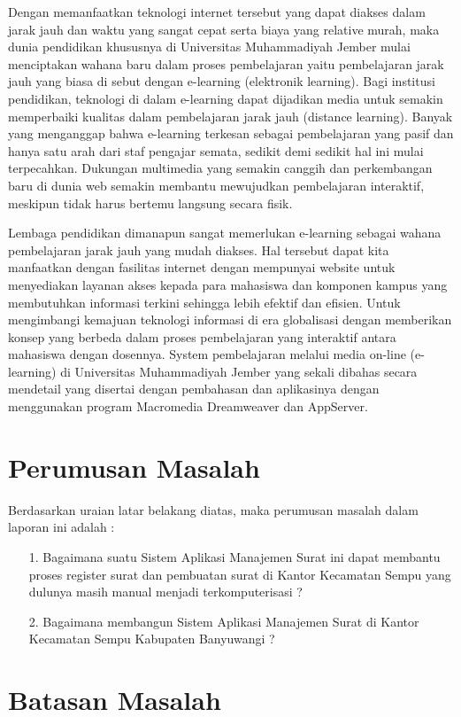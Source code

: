 \documentclass{jtetiproposalskripsi}
\begin{document}
Dengan memanfaatkan teknologi internet tersebut yang dapat diakses dalam jarak jauh dan waktu yang sangat cepat serta biaya yang relative murah, maka dunia pendidikan khususnya di Universitas Muhammadiyah Jember mulai menciptakan wahana baru dalam proses pembelajaran yaitu pembelajaran jarak jauh yang biasa di sebut dengan e-learning (elektronik  learning). Bagi institusi pendidikan, teknologi di dalam e-learning dapat dijadikan media untuk semakin memperbaiki kualitas dalam pembelajaran jarak jauh (distance learning). Banyak yang menganggap bahwa e-learning terkesan sebagai pembelajaran yang pasif dan hanya satu arah dari staf pengajar semata, sedikit demi sedikit hal ini mulai terpecahkan. Dukungan multimedia yang semakin canggih dan perkembangan baru di dunia web semakin membantu mewujudkan pembelajaran interaktif, meskipun tidak harus bertemu langsung secara fisik.

Lembaga pendidikan dimanapun sangat memerlukan e-learning sebagai wahana  pembelajaran jarak jauh yang mudah diakses. Hal tersebut dapat kita manfaatkan dengan fasilitas internet dengan mempunyai website untuk menyediakan layanan akses kepada para mahasiswa dan komponen kampus yang membutuhkan informasi terkini sehingga lebih efektif dan efisien.
Untuk mengimbangi kemajuan teknologi informasi di era globalisasi dengan memberikan konsep yang berbeda dalam proses pembelajaran yang interaktif antara mahasiswa dengan dosennya. System pembelajaran melalui media on-line (e-learning) di Universitas Muhammadiyah Jember yang sekali dibahas secara mendetail yang disertai dengan pembahasan dan aplikasinya dengan menggunakan program Macromedia Dreamweaver dan AppServer.


\section{Perumusan Masalah}
Berdasarkan uraian latar belakang diatas, maka perumusan masalah dalam laporan ini adalah :	 
\begin{itemize}
\item[1.] Bagaimana suatu Sistem Aplikasi Manajemen Surat ini dapat membantu proses register surat dan pembuatan surat di Kantor Kecamatan Sempu yang dulunya masih manual menjadi terkomputerisasi ?
\item[2.] Bagaimana membangun Sistem Aplikasi Manajemen Surat di Kantor Kecamatan Sempu Kabupaten Banyuwangi ?
\end{itemize}

\section{Batasan Masalah}
\end{document}
